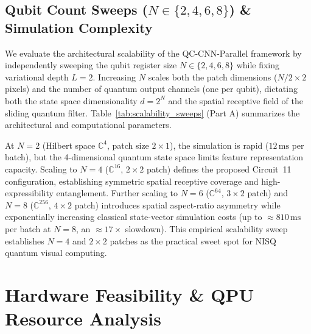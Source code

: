 \documentclass[pdflatex,sn-mathphys-num]{sn-jnl}%
\theoremstyle{thmstyleone}%
\theoremstyle{thmstyletwo}%
\theoremstyle{thmstylethree}%
\begin{document}
\subsection{Qubit Count Sweeps ($N \in \{2, 4, 6, 8\}$) \& Simulation Complexity}
We evaluate the architectural scalability of the QC-CNN-Parallel framework by independently sweeping the qubit register size $N \in \{2, 4, 6, 8\}$ while fixing variational depth $L = 2$. Increasing $N$ scales both the patch dimensions ($N/2 \times 2$ pixels) and the number of quantum output channels (one per qubit), dictating both the state space dimensionality $d = 2^N$ and the spatial receptive field of the sliding quantum filter. Table~\ref{tab:scalability_sweeps} (Part A) summarizes the architectural and computational parameters.

At $N = 2$ (Hilbert space $\mathbb{C}^4$, patch size $2 \times 1$), the simulation is rapid ($12\,\mathrm{ms}$ per batch), but the 4-dimensional quantum state space limits feature representation capacity. Scaling to $N = 4$ ($\mathbb{C}^{16}$, $2 \times 2$ patch) defines the proposed Circuit~11 configuration, establishing symmetric spatial receptive coverage and high-expressibility entanglement. Further scaling to $N = 6$ ($\mathbb{C}^{64}$, $3 \times 2$ patch) and $N = 8$ ($\mathbb{C}^{256}$, $4 \times 2$ patch) introduces spatial aspect-ratio asymmetry while exponentially increasing classical state-vector simulation costs (up to $\approx 810\,\mathrm{ms}$ per batch at $N=8$, an $\approx 17\times$ slowdown). This empirical scalability sweep establishes $N = 4$ and $2 \times 2$ patches as the practical sweet spot for NISQ quantum visual computing.

\section{Hardware Feasibility \& QPU Resource Analysis}
\label{sec:hardware}
\end{document}
